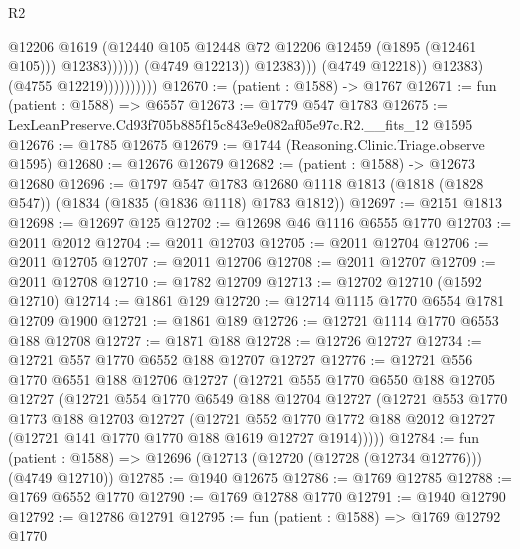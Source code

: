 \begin{lexlean}{R2}
\begin{coremodule}
                                              @12206
                                              @1619
                                              (@12440
                                                @105
                                                @12448
                                                @72
                                                @12206
                                                @12459
                                                (@1895 (@12461 @105)))
                                              @12383))))))
                                  (@4749 @12213))
                                @12383)))
                          (@4749 @12218))
                        @12383)
                      (@4755 @12219))))))))))
@12670 := (patient : @1588) -> @1767
@12671 := fun (patient : @1588) => @6557
@12673 := @1779 @547 @1783
@12675 := LexLeanPreserve.Cd93f705b885f15c843e9e082af05e97c.R2.__fits_12 @1595
@12676 := @1785 @12675
@12679 := @1744 (Reasoning.Clinic.Triage.observe @1595)
@12680 := @12676 @12679
@12682 := (patient : @1588) -> @12673 @12680
@12696 := @1797
    @547
    @1783
    @12680
    @1118
    @1813
    (@1818 (@1828 @547))
    (@1834 (@1835 (@1836 @1118) @1783 @1812))
@12697 := @2151 @1813
@12698 := @12697 @125
@12702 := @12698 @46 @1116 @6555 @1770
@12703 := @2011 @2012
@12704 := @2011 @12703
@12705 := @2011 @12704
@12706 := @2011 @12705
@12707 := @2011 @12706
@12708 := @2011 @12707
@12709 := @2011 @12708
@12710 := @1782 @12709
@12713 := @12702 @12710 (@1592 @12710)
@12714 := @1861 @129
@12720 := @12714 @1115 @1770 @6554 @1781 @12709 @1900
@12721 := @1861 @189
@12726 := @12721 @1114 @1770 @6553 @188 @12708
@12727 := @1871 @188
@12728 := @12726 @12727
@12734 := @12721 @557 @1770 @6552 @188 @12707 @12727
@12776 := @12721
    @556
    @1770
    @6551
    @188
    @12706
    @12727
    (@12721
      @555
      @1770
      @6550
      @188
      @12705
      @12727
      (@12721
        @554
        @1770
        @6549
        @188
        @12704
        @12727
        (@12721
          @553
          @1770
          @1773
          @188
          @12703
          @12727
          (@12721
            @552
            @1770
            @1772
            @188
            @2012
            @12727
            (@12721 @141 @1770 @1770 @188 @1619 @12727 @1914)))))
@12784 := fun (patient : @1588) => @12696 (@12713 (@12720 (@12728 (@12734 @12776))) (@4749 @12710))
@12785 := @1940 @12675
@12786 := @1769 @12785
@12788 := @1769 @6552 @1770
@12790 := @1769 @12788 @1770
@12791 := @1940 @12790
@12792 := @12786 @12791
@12795 := fun (patient : @1588) => @1769 @12792 @1770

\end{coremodule}
\end{lexlean}
